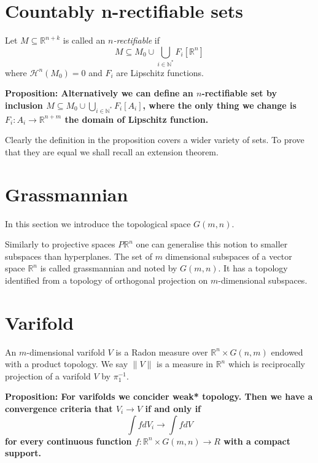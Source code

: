 \documentclass{article}
\begin{document}
\section{Countably n-rectifiable sets}
Let $M\subseteq\mathbb{R}^{n+k}$ is called an \emph{$n$-rectifiable} if
\[
    M\subseteq M_0\cup\bigcup_{i\in\mathbb{N}^*}F_i[\mathbb{R}^n]
\]
where $\mathcal{H}^n(M_0)=0$ and $F_i$ are Lipschitz functions.

\textbf{Proposition: Alternatively we can define an $n$-rectifiable set by
inclusion $M\subseteq M_0\cup\bigcup_{i\in\mathbb{N}^*}F_i[A_i]$, where the only
thing we change is $F_i:A_i\rightarrow\mathbb{R}^{n+m}$ the domain of Lipschitz
function.}

Clearly the definition in the proposition covers a wider variety of sets. To
prove that they are equal we shall recall an extension theorem.

\section{Grassmannian}

In this section we introduce the topological space $G(m,n)$.
\vspace{1ex}

Similarly to projective spaces $P\mathbb{R}^n$ one can generalise this notion to
smaller subspaces than hyperplanes. The set of $m$ dimensional subspaces of a
vector space $\mathbb{R}^n$ is called grassmannian and noted by $G(m,n)$. It
has a topology identified from a topology of orthogonal projection on
$m$-dimensional subspaces.

\section{Varifold}

An $m$-dimensional varifold $V$ is a Radon measure over $\mathbb{R}^n\times
G(n,m)$ endowed with a product topology. We say $\|V\|$ is a measure in
$\mathbb{R}^n$ which is reciprocally projection of a varifold $V$ by $\pi_1^{-1}$.

\textbf{Proposition: For varifolds we concider weak* topology. Then we have a
convergence criteria that $V_i\rightarrow V$ if and only if
\[\int fdV_i\rightarrow\int fdV\]
for every continuous function $f:\mathbb{R}^n\times G(m,n)\rightarrow R$ with a
compact support.}
\vspace{1ex}
\end{document}
